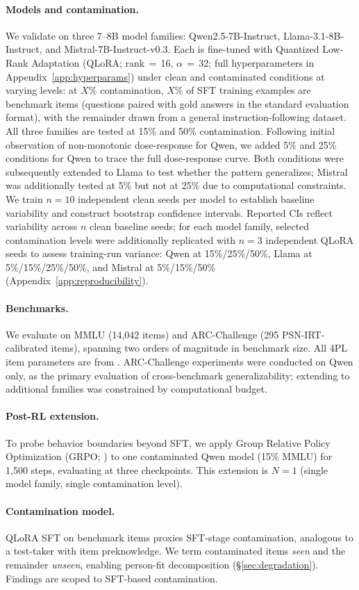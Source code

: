 \paragraph{Models and contamination.}
We validate on three 7--8B model families: Qwen2.5-7B-Instruct, Llama-3.1-8B-Instruct, and Mistral-7B-Instruct-v0.3.
Each is fine-tuned with Quantized Low-Rank Adaptation (QLoRA; rank\,$=$\,16, $\alpha$\,$=$\,32; full hyperparameters in Appendix~\ref{app:hyperparams}) under clean and contaminated conditions at varying levels: at $X\%$ contamination, $X\%$ of SFT training examples are benchmark items (questions paired with gold answers in the standard evaluation format), with the remainder drawn from a general instruction-following dataset.
All three families are tested at 15\% and 50\% contamination.
Following initial observation of non-monotonic dose-response for Qwen, we added 5\% and 25\% conditions for Qwen to trace the full dose-response curve.
Both conditions were subsequently extended to Llama to test whether the pattern generalizes; Mistral was additionally tested at 5\% but not at 25\% due to computational constraints.
We train $n{=}10$ independent clean seeds per model to establish baseline variability and construct bootstrap confidence intervals.
Reported CIs reflect variability across $n$ clean baseline seeds; for each model family, selected contamination levels were additionally replicated with $n{=}3$ independent QLoRA seeds to assess training-run variance: Qwen at 15\%/25\%/50\%, Llama at 5\%/15\%/25\%/50\%, and Mistral at 5\%/15\%/50\% (Appendix~\ref{app:reproducibility}).

\paragraph{Benchmarks.}
We evaluate on MMLU \citep{hendrycks2021mmlu} (14,042 items) and ARC-Challenge \citep{clark2018arc} (295 PSN-IRT-calibrated items), spanning two orders of magnitude in benchmark size.
All 4PL item parameters are from \citet{psnirt2026}.
ARC-Challenge experiments were conducted on Qwen only, as the primary evaluation of cross-benchmark generalizability; extending to additional families was constrained by computational budget.

\paragraph{Post-RL extension.}
To probe behavior boundaries beyond SFT, we apply Group Relative Policy Optimization (GRPO; \citealp{shao2024}) to one contaminated Qwen model (15\% MMLU) for 1,500 steps, evaluating at three checkpoints.
This extension is $N{=}1$ (single model family, single contamination level).

\paragraph{Contamination model.}
QLoRA SFT on benchmark items proxies SFT-stage contamination, analogous to a test-taker with item preknowledge.
We term contaminated items \emph{seen} and the remainder \emph{unseen}, enabling person-fit decomposition (\S\ref{sec:degradation}).
Findings are scoped to SFT-based contamination.
